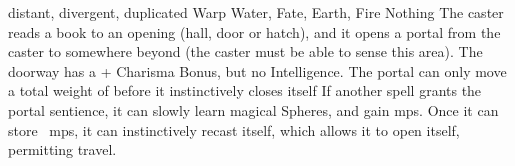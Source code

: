   {distant, divergent, duplicated}%
  {Warp}%
  {Water, Fate, Earth, Fire}%
  {Nothing}%
  {The caster reads a book to an opening (hall, door or hatch), and it opens a portal from the caster to somewhere beyond \spellRange
  (the caster must be able to sense this area).
  The doorway has a + Charisma Bonus, but no Intelligence.
  The portal can only move a total \gls{weight} of  before it instinctively closes itself}%
  {
  If another spell grants the portal sentience, it can slowly learn magical Spheres, and gain \glspl{mp}.
  Once it can store ~\glspl{mp}, it can instinctively recast itself, which allows it to open itself, permitting travel.}
